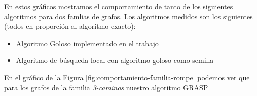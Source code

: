 En estos gráficos mostramos el comportamiento de tanto de los siguientes algoritmos para dos famlias de grafos. Los algoritmos medidos son los siguientes (todos en proporción al algoritmo exacto):


\begin{itemize}
 \item Algoritmo Goloso implementado en el trabajo
 \item Algoritmo de búsqueda local con algoritmo goloso como semilla
\end{itemize}


En el gráfico de la Figura \ref{fig:comportamiento-familia-rompe} podemos ver que para los grafos de la familia \emph{3-caminos} nuestro algoritmo GRASP